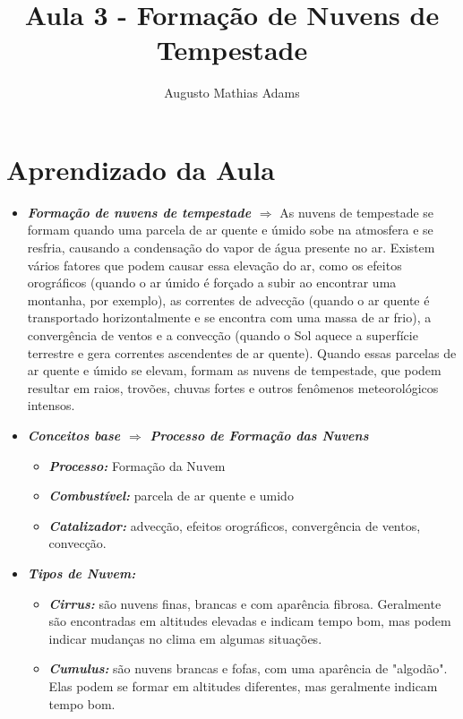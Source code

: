 \documentclass[a4paper, 12pt, onecolumn,singlespacing]{article}
\title{Aula 3 - Formação de Nuvens de Tempestade}
\author[1]{Augusto Mathias Adams}
\affil[1]{augusto.adams@ufpr.br}
\begin{document}
	
	\maketitle
	
	\section{Aprendizado da Aula}
	
	\begin{itemize}
		\item \textbf{\textit{Formação de nuvens de tempestade $\Rightarrow$ }} As nuvens de tempestade se formam quando uma parcela de ar quente e úmido sobe na atmosfera e se resfria, causando a condensação do vapor de água presente no ar. Existem vários fatores que podem causar essa elevação do ar, como os efeitos orográficos (quando o ar úmido é forçado a subir ao encontrar uma montanha, por exemplo), as correntes de advecção (quando o ar quente é transportado horizontalmente e se encontra com uma massa de ar frio), a convergência de ventos e a convecção (quando o Sol aquece a superfície terrestre e gera correntes ascendentes de ar quente). Quando essas parcelas de ar quente e úmido se elevam, formam as nuvens de tempestade, que podem resultar em raios, trovões, chuvas fortes e outros fenômenos meteorológicos intensos.
		\item \textbf{\textit{Conceitos base $\Rightarrow$ Processo de Formação das Nuvens}}
		\begin{itemize}
			\item \textbf{\textit{Processo: }}Formação da Nuvem
			\item \textbf{\textit{Combustível: }}parcela de ar quente e umido
			\item \textbf{\textit{Catalizador: }}advecção, efeitos orográficos, convergência de ventos, convecção.
		\end{itemize}
		\item \textbf{\textit{Tipos de Nuvem:}}
		\begin{itemize}
			\item  \textbf{\textit{Cirrus:}} são nuvens finas, brancas e com aparência fibrosa. Geralmente são encontradas em altitudes elevadas e indicam tempo bom, mas podem indicar mudanças no clima em algumas situações.
			
			\item \textbf{\textit{Cumulus:}} são nuvens brancas e fofas, com uma aparência de "algodão". Elas podem se formar em altitudes diferentes, mas geralmente indicam tempo bom.
			

\end{itemize}
\end{itemize}
\end{document}
